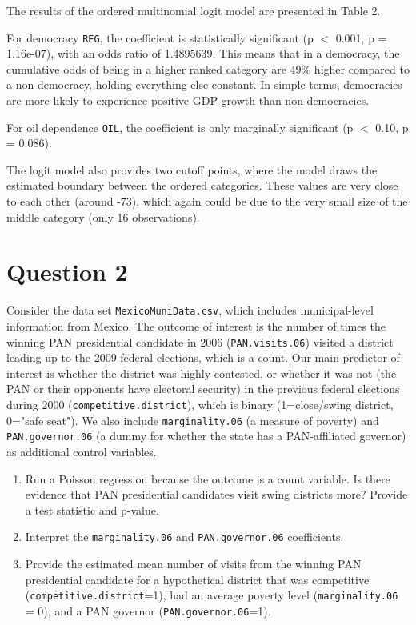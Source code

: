 \documentclass[12pt,letterpaper]{article}
\begin{document}
\noindent The results of the ordered multinomial logit model are presented in Table 2. \newline

\noindent For democracy \texttt{REG}, the coefficient is statistically significant 
(p $<$ 0.001, p = 1.16e-07), with an odds ratio of 1.4895639. This means that in a democracy, the cumulative odds of being in a higher ranked category are 49\% higher compared to a non-democracy, holding everything else constant. In simple terms, democracies are more likely to experience positive GDP growth than non-democracies.\newline

\noindent For oil dependence \texttt{OIL}, the coefficient is only marginally significant (p $<$ 0.10, p = 0.086).\newline

\noindent The logit model also provides two cutoff points, where the model draws the estimated boundary between the ordered categories. These values are very close to each other (around -73), which again could be due to the very small size of the middle category (only 16 observations). \newline

\section*{Question 2} 
\vspace{.25cm}

\noindent Consider the data set \texttt{MexicoMuniData.csv}, which includes municipal-level information from Mexico. The outcome of interest is the number of times the winning PAN presidential candidate in 2006 (\texttt{PAN.visits.06}) visited a district leading up to the 2009 federal elections, which is a count. Our main predictor of interest is whether the district was highly contested, or whether it was not (the PAN or their opponents have electoral security) in the previous federal elections during 2000 (\texttt{competitive.district}), which is binary (1=close/swing district, 0="safe seat"). We also include \texttt{marginality.06} (a measure of poverty) and \texttt{PAN.governor.06} (a dummy for whether the state has a PAN-affiliated governor) as additional control variables. 

\begin{enumerate}
	\item [(a)]
	Run a Poisson regression because the outcome is a count variable. Is there evidence that PAN presidential candidates visit swing districts more? Provide a test statistic and p-value.

	\item [(b)]
	Interpret the \texttt{marginality.06} and \texttt{PAN.governor.06} coefficients.
	
	\item [(c)]
	Provide the estimated mean number of visits from the winning PAN presidential candidate for a hypothetical district that was competitive (\texttt{competitive.district}=1), had an average poverty level (\texttt{marginality.06} = 0), and a PAN governor (\texttt{PAN.governor.06}=1).
	
\end{enumerate}
\end{document}
